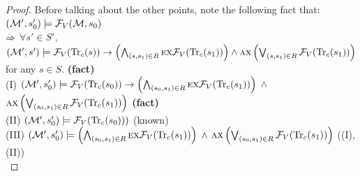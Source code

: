 \documentclass{article}
\begin{document}
\begin{proof}
      Before talking about the other points, note the following fact that:\\
      $({\cal M}',s_0') \models {\cal F}_V({\cal M},s_0)$\\
      $\Rightarrow$ $\forall s'\in S'$, $({\cal M}', s') \models {\cal F}_V(\textrm{Tr}_c(s)) \rightarrow \left(\bigwedge_{(s,s_1)\in R} \textsc{e} \textsc{x} {\cal F}_V(\textrm{Tr}_c(s_1))\right) \wedge \textsc{a} \textsc{x} \left( \bigvee_{(s,s_1)\in R} {\cal F}_V(\textrm{Tr}_c(s_1))\right)$ for any $s\in S$.   \hfill  \textbf{(fact)}\\
      (I) $({\cal M}', s_0') \models {\cal F}_V(\textrm{Tr}_c(s_0)) \rightarrow \left(\bigwedge_{(s_0, s_1) \in R} \textsc{e} \textsc{x} {\cal F}_V(\textrm{Tr}_c(s_1))\right)$ $\wedge$ $\textsc{a} \textsc{x} \left(\bigvee_{(s_0, s_1) \in R} {\cal F}_V(\textrm{Tr}_c(s_1)) \right)$     \hfill  \textbf{(fact)}\\
        (II) $({\cal M}', s_0') \models {\cal F}_V(\textrm{Tr}_c(s_0)))$  \hfill  (known)\\
        (III) $({\cal M}', s_0') \models \left(\bigwedge_{(s_0, s_1) \in R} \textsc{e} \textsc{x} {\cal F}_V(\textrm{Tr}_c(s_1))\right)$ $\wedge$ $\textsc{a} \textsc{x} \left(\bigvee_{(s_0, s_1) \in R} {\cal F}_V(\textrm{Tr}_c(s_1)) \right)$  \hfill  ((I),(II))\\


\end{proof}
\end{document}
